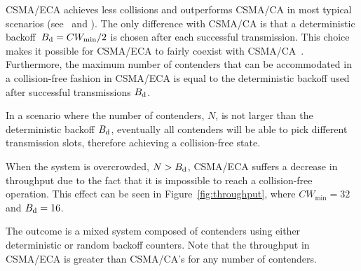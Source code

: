 CSMA/ECA achieves less collisions and outperforms CSMA/CA in most typical scenarios (see~\cite{HE} and \cite{E2CA_performance}). The only difference with CSMA/CA is that a deterministic \mbox{backoff}~\mbox{$B_{\mbox{\scriptsize{d}}}=CW_{\min}/2$} is chosen after each successful transmission. This choice makes it possible for CSMA/ECA to fairly coexist with CSMA/CA~\cite{CSMA_ECA}. Furthermore, the maximum number of contenders that can be accommodated in a collision-free fashion in CSMA/ECA is equal to the deterministic backoff used after successful transmissions $B_{\mbox{\scriptsize{d}}}$.


In a scenario where the number of contenders, $N$, is not larger than the deterministic backoff $B_{\mbox{\scriptsize{d}}}$, eventually all contenders will be able to pick different transmission slots, therefore achieving a collision-free state.

When the system is overcrowded, $N>B_{\mbox{\scriptsize{d}}}$, CSMA/ECA suffers a decrease in throughput due to the fact that it is impossible to reach a collision-free operation. This effect can be seen in Figure~\ref{fig:throughput}, where $CW_{\min}=32$ and $B_{\mbox{\scriptsize{d}}}=16$.




The outcome is a mixed system composed of contenders using either deterministic or random backoff counters. Note that the throughput in CSMA/ECA is greater than CSMA/CA's for any number of contenders.

